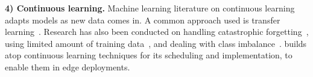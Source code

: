 \noindent\textbf{4) Continuous learning.} Machine learning literature on continuous learning adapts models as new data comes in. %
A common approach used is transfer learning~\cite{DBLP:journals/corr/RazavianASC14,DBLP:conf/edge/LuSTLZCP19,mullapudi2019,44873}. Research has also been conducted on handling catastrophic forgetting~\cite{DBLP:journals/corr/abs-1708-01547,datadrift-a}, using limited amount of training data~\cite{icarl-14,DBLP:journals/corr/abs-1905-10887}, and dealing with class imbalance~\cite{Belouadah_2019_ICCV,DBLP:journals/corr/abs-1905-13260}. 
{\name} builds atop continuous learning techniques for its scheduling and implementation, to enable them in edge deployments. 


